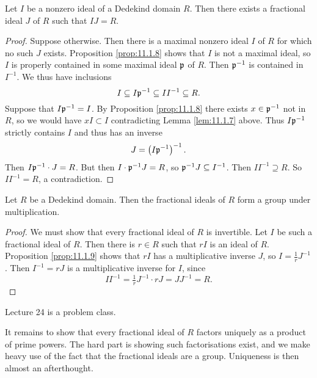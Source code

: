 \begin{proposition}
\label{prop:11.1.9}
Let $ I $ be a nonzero ideal of a Dedekind domain $ R $. Then there exists a fractional ideal $ J $ of $ R $ such that $ IJ = R $.
\end{proposition}

\begin{proof}
Suppose otherwise. Then there is a maximal nonzero ideal $ I $ of $ R $ for which no such $ J $ exists. Proposition \ref{prop:11.1.8} shows that $ I $ is not a maximal ideal, so $ I $ is properly contained in some maximal ideal $ \mathfrak{p} $ of $ R $. Then $ \mathfrak{p}^{-1} $ is contained in $ I^{-1} $. We thus have inclusions
$$ I \subseteq I\mathfrak{p}^{-1} \subseteq II^{-1} \subseteq R. $$
Suppose that $ I\mathfrak{p}^{-1} = I $. By Proposition \ref{prop:11.1.8} there exists $ x \in \mathfrak{p}^{-1} $ not in $ R $, so we would have $ xI \subset I $ contradicting Lemma \ref{lem:11.1.7} above. Thus $ I\mathfrak{p}^{-1} $ strictly contains $ I $ and thus has an inverse
$$ J = \left( I\mathfrak{p}^{-1} \right)^{-1}. $$
Then $ I\mathfrak{p}^{-1} \cdot J = R $. But then $ I \cdot \mathfrak{p}^{-1}J = R $, so $ \mathfrak{p}^{-1}J \subseteq I^{-1} $. Then $ II^{-1} \supseteq R $. So $ II^{-1} = R $, a contradiction.
\end{proof}

\begin{theorem}
Let $ R $ be a Dedekind domain. Then the fractional ideals of $ R $ form a group under multiplication.
\end{theorem}

\begin{proof}
We must show that every fractional ideal of $ R $ is invertible. Let $ I $ be such a fractional ideal of $ R $. Then there is $ r \in R $ such that $ rI $ is an ideal of $ R $. Proposition \ref{prop:11.1.9} shows that $ rI $ has a multiplicative inverse $ J $, so $ I = \tfrac{1}{r}J^{-1} $. Then $ I^{-1} = rJ $ is a multiplicative inverse for $ I $, since
$$ II^{-1} = \tfrac{1}{r}J^{-1} \cdot rJ = JJ^{-1} = R. $$
\end{proof}


Lecture 24 is a problem class.


It remains to show that every fractional ideal of $ R $ factors uniquely as a product of prime powers. The hard part is showing such factorisations exist, and we make heavy use of the fact that the fractional ideals are a group. Uniqueness is then almost an afterthought.

